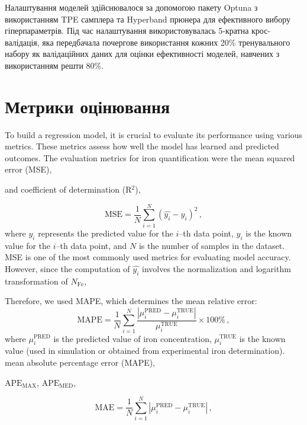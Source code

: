 \documentclass[12pt,a4paper,titlepage,oneside]{book}
\numberwithin{equation}{part}
\begin{document}
Налаштування моделей здійснювалося за допомогою пакету Optuna \cite{Akiba2019} з використанням TPE самплера та Hyperband прюнера
для ефективного вибору гіперпараметрів.
Під час налаштування використовувалась 5-кратна крос-валідація, яка передбачала почергове використання кожних 20\% тренувального набору
як валідаційних даних для оцінки ефективності моделей, навчених з використанням решти 80\%.




\section{Метрики оцінювання}

To build a regression model, it is crucial to evaluate its performance using various metrics.
These metrics assess how well the model has learned and predicted outcomes.
The evaluation metrics for iron quantification were the mean squared error (MSE),

and coefficient of determination (R$^2$), 

\begin{equation}
\label{eqMSE}
    \mathrm{MSE} = \frac{1}{N}\displaystyle\sum_{i=1}^{N} (\hat{y_i}-y_i)^2\,,
\end{equation}
where $\hat{y_i}$ represents the predicted value for the $i$--th data point,
$y_i$ is the known value for the $i$--th data point,
and $N$ is the number of samples in the dataset.
MSE is one of the most commonly used metrics for evaluating model accuracy.
However, since the computation of $\hat{y_i}$ involves the normalization and logarithm transformation of $N_\mathrm{Fe}$,

%
%
%

Therefore, we used MAPE, which determines the mean relative error:
\begin{equation}
\label{eqMAPE}
    \mathrm{MAPE} = \frac{1}{N}\displaystyle\sum_{i=1}^{N} \frac{|\mu^\mathrm{PRED}_i-\mu^\mathrm{TRUE}_i|}{\mu^\mathrm{TRUE}_i}\times 100 \%\,,
\end{equation}
where $\mu^\mathrm{PRED}_i$ is the predicted value of iron concentration,
$\mu^\mathrm{TRUE}_i$ is the known value (used in simulation or obtained from experimental iron determination).
mean absolute percentage error (MAPE),

$\mathrm{APE}_\mathrm{MAX}$, 
$\mathrm{APE}_\mathrm{MED}$, 

\begin{equation}
\label{eqMAE}
    \mathrm{MAE} = \frac{1}{N}\displaystyle\sum_{i=1}^{N} |\mu^\mathrm{PRED}_i-\mu^\mathrm{TRUE}_i|\,,
\end{equation}
\end{document}
